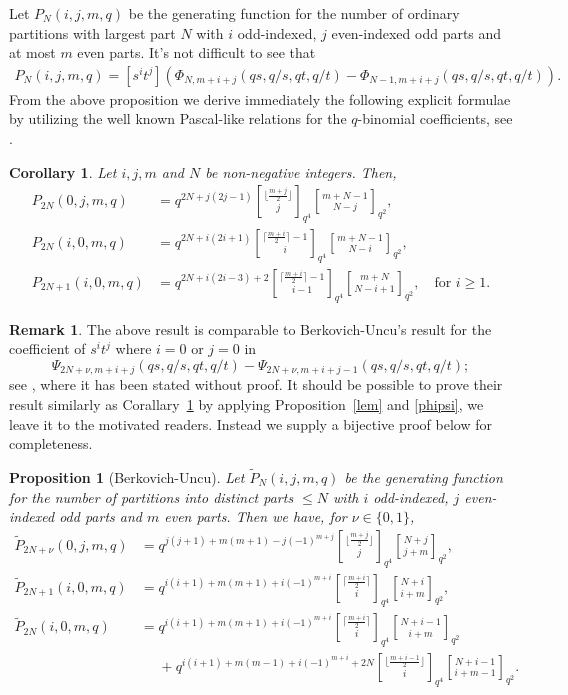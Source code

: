 \documentclass[12pt]{amsart}
\numberwithin{equation}{section}
\theoremstyle{plain}
\newtheorem{corollary}[theorem]{Corollary}
\newtheorem{proposition}[theorem]{Proposition}
\theoremstyle{definition}
\newtheorem{remark}[theorem]{Remark}
\begin{document}
Let ${P}_N(i,j,m,q)$ be the generating function for the number of 
ordinary partitions with largest  part $N$ with $i$ 
odd-indexed, $j$ even-indexed odd parts and  at most $m$ even parts. It's not difficult to see that
\begin{align}\label{key-formula}
{P}_N(i,j,m,q)=[s^i t^j]\left(\Phi_{N,m+i+j}(qs,q/s,qt,q/t)-\Phi_{N-1,m+i+j}(qs,q/s,qt,q/t)  \right).
\end{align}
From the above proposition we derive immediately the following explicit formulae by utilizing the well known Pascal-like relations for the $q$-binomial coefficients, see \cite[(3.3.3)-(3.3.4)]{andtp}.
\begin{corollary}\label{ana-final-bu}
Let $i, j,m$ and $N$ be non-negative integers. Then,
\begin{align}
{P}_{2N}(0,j,m,q)&=q^{2N+j(2j-1)}{\lfloor\frac{m+j}{2} \rfloor \brack j}_{q^4}{m+N-1\brack N-j}_{q^2},\\
{P}_{2N}(i,0,m,q)&=q^{2N+i(2i+1)}{\lceil \frac{m+i}{2}\rceil-1\brack i}_{q^4}
{m+N-1\brack N-i}_{q^2},\nonumber \\
{P}_{2N+1}(i,0,m,q)&=q^{2N+i(2i-3)+2}{\lceil \frac{m+i}{2}\rceil-1\brack i-1}_{q^4}
{m+N\brack N-i+1}_{q^2},\quad \text{for }i\geq 1.\nonumber
\end{align}
\end{corollary}


\begin{remark} The above result is comparable to 
Berkovich-Uncu's result for the coefficient of $s^i t^j$ where  $i=0$ or $j=0$  in
$$

\Psi_{2N+\nu,m+i+j}(qs,q/s,qt,q/t)-\Psi_{2N+\nu,m+i+j-1}(qs,q/s,qt,q/t);
$$
 see \cite[Proposition~7.4 ]{bu2}, where it has been stated without proof. It should be possible to prove their result similarly as Corallary~\ref{ana-final-bu} by applying Proposition~\ref{lem} and \eqref{phipsi}, we leave it to the motivated readers. Instead we supply a bijective proof below for completeness.
\end{remark}

\begin{proposition}[Berkovich-Uncu\cite{bu2}]\label{final-bu}
Let $\tilde{P}_N(i,j,m,q)$ be the generating function for the number of partitions into distinct parts $\leq N$ with $i$ odd-indexed, $j$ even-indexed odd parts and $m$ even parts. Then we have, for $\nu\in\{0,1\}$,
\begin{align}\label{final-bu-id}
\tilde{P}_{2N+\nu}(0,j,m,q)&=q^{j(j+1)+m(m+1)-j(-1)^{m+j}}{\lfloor \frac{m+j}{2}\rfloor\brack j}_{q^4}{N+j\brack j+m}_{q^2},\\
\nonumber
\tilde{P}_{2N+1}(i,0,m,q)&=q^{i(i+1)+m(m+1)+i(-1)^{m+i}}{\lceil \frac{m+i}{2}\rceil\brack i}_{q^4}{N+i\brack i+m}_{q^2},\\
\nonumber
\tilde{P}_{2N}(i,0,m,q)&=q^{i(i+1)+m(m+1)+i(-1)^{m+i}}{\lceil \frac{m+i}{2}\rceil\brack i}_{q^4}{N+i-1\brack i+m}_{q^2}\\
\nonumber
&\phantom{qqq}+q^{i(i+1)+m(m-1)+i(-1)^{m+i}+2N}{\lfloor \frac{m+i-1}{2}\rfloor\brack i}_{q^4}{N+i-1\brack i+m-1}_{q^2}.
\end{align}
\end{proposition}
\end{document}
